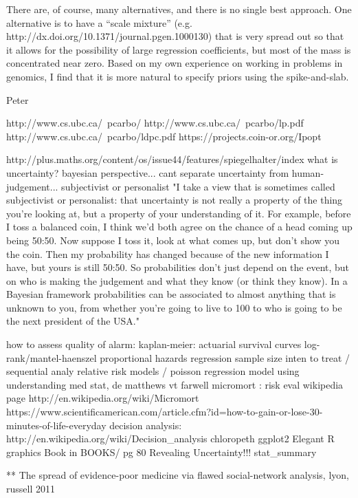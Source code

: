 \documentclass[12pt]{article}
\begin{document}
There are, of course, many alternatives, and there is no single best approach. One alternative is to have a “scale mixture” (e.g. http://dx.doi.org/10.1371/journal.pgen.1000130) that is very spread out so that it allows for the possibility of large regression coefficients, but most of the mass is concentrated near zero. Based on my own experience on working in problems in genomics, I find that it is more natural to specify priors using the spike-and-slab.

Peter

http://www.cs.ubc.ca/~pcarbo/
http://www.cs.ubc.ca/~pcarbo/lp.pdf
http://www.cs.ubc.ca/~pcarbo/ldpc.pdf
https://projects.coin-or.org/Ipopt



http://plus.maths.org/content/os/issue44/features/spiegelhalter/index
what is uncertainty? bayesian perspective... cant separate uncertainty from
human-judgement... subjectivist or personalist
"I take a view that is sometimes called subjectivist or personalist: that uncertainty is not really a property of the thing you're looking at, but a property of your understanding of it. For example, before I toss a balanced coin, I think we'd both agree on the chance of a head coming up being 50:50. Now suppose I toss it, look at what comes up, but don't show you the coin. Then my probability has changed because of the new information I have, but yours is still 50:50. So probabilities don't just depend on the event, but on who is making the judgement and what they know (or think they know). In a Bayesian framework probabilities can be associated to almost anything that is unknown to you, from whether you're going to live to 100 to who is going to be the next president of the USA."


how to assess quality of alarm:
kaplan-meier: actuarial survival curves
log-rank/mantel-haenszel
proportional hazards regression
sample size
inten to treat / sequential analy
relative risk models / poisson regression model
using understanding med stat, de matthews vt farwell
micromort : risk eval wikipedia page
http://en.wikipedia.org/wiki/Micromort
https://www.scientificamerican.com/article.cfm?id=how-to-gain-or-lose-30-minutes-of-life-everyday
decision analysis:
http://en.wikipedia.org/wiki/Decision_analysis
chloropeth
ggplot2 Elegant R graphics Book in BOOKS/ pg 80 Revealing Uncertainty!!!
stat_summary



** The spread of evidence-poor medicine via flawed social-network analysis, lyon, russell 2011
\end{document}
